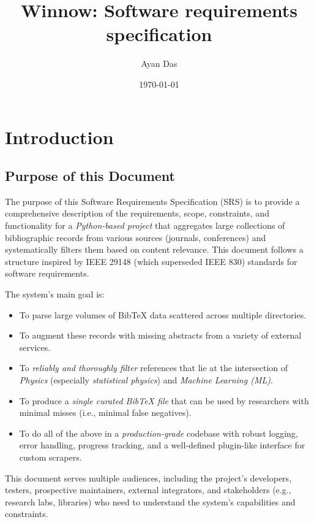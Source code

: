 \documentclass[12pt]{article}
\title{Winnow: Software requirements specification}
\author{Ayan Das}
\date{\today}
\begin{document}
\maketitle

\tableofcontents
\newpage

\section{Introduction}

\subsection{Purpose of this Document}
The purpose of this Software Requirements Specification (SRS) is to provide a comprehensive description of the requirements, scope, constraints, and functionality for a \emph{Python-based project} that aggregates large collections of bibliographic records from various sources (journals, conferences) and systematically filters them based on content relevance. This document follows a structure inspired by IEEE 29148 (which superseded IEEE 830) standards for software requirements. 

The system's main goal is:
\begin{itemize}
  \item To parse large volumes of BibTeX data scattered across multiple directories.
  \item To augment these records with missing abstracts from a variety of external services.
  \item To \emph{reliably and thoroughly filter} references that lie at the intersection of \emph{Physics} (especially \emph{statistical physics}) and \emph{Machine Learning (ML)}.
  \item To produce a \emph{single curated BibTeX file} that can be used by researchers with minimal misses (i.e., minimal false negatives).
  \item To do all of the above in a \emph{production-grade} codebase with robust logging, error handling, progress tracking, and a well-defined plugin-like interface for custom scrapers.
\end{itemize}

This document serves multiple audiences, including the project’s developers, testers, prospective maintainers, external integrators, and stakeholders (e.g., research labs, libraries) who need to understand the system’s capabilities and constraints.
\end{document}
